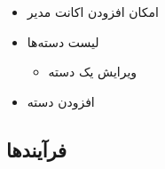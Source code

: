 \documentclass[]{article}
\begin{document}
\begin{itemize}
\begin{itemize}
\item
امکان افزودن اکانت مدیر

\item
لیست دسته‌ها

\begin{itemize}[label={$\blacksquare$}]
\item
ویرایش یک دسته
\end{itemize}

\item
افزودن دسته
\end{itemize}


\end{itemize}

\newpage

\subsection*{{\titr فرآیندها}}
\end{document}
